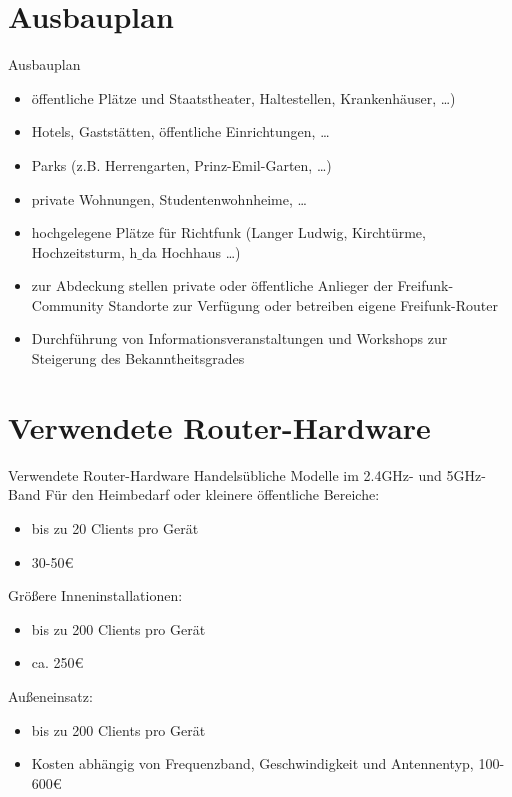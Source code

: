 \documentclass{beamer}
\begin{document}
\section{Ausbauplan}
\begin{frame}{Ausbauplan}
\vfill
\begin{itemize}
	\item öffentliche Plätze und Staatstheater, Haltestellen, Krankenhäuser, \ldots)
	\item Hotels, Gaststätten, öffentliche Einrichtungen, \ldots
	\item Parks (z.B. Herrengarten, Prinz-Emil-Garten, \ldots)
	\item private Wohnungen, Studentenwohnheime, \ldots
	\item hochgelegene Plätze für Richtfunk (Langer Ludwig, Kirchtürme, Hochzeitsturm, h$\_$da Hochhaus \ldots)
\end{itemize}
\vfill
\begin{itemize}
	\item zur Abdeckung stellen private oder öffentliche Anlieger der Freifunk-Community Standorte zur Verfügung oder betreiben eigene Freifunk-Router
	\item Durchführung von Informationsveranstaltungen und Workshops zur Steigerung des Bekanntheitsgrades
\end{itemize}
\vfill
\end{frame}

\section{Verwendete Router-Hardware}
\begin{frame}{Verwendete Router-Hardware}
Handelsübliche Modelle im 2.4GHz- und 5GHz-Band
\vfill
Für den Heimbedarf oder kleinere öffentliche Bereiche:
\begin{itemize}
\item bis zu 20 Clients pro Gerät
\item 30-50\euro{}
\end{itemize}
\vfill

Größere Inneninstallationen:
\begin{itemize}
\item bis zu 200 Clients pro Gerät
\item ca. 250\euro{}
\end{itemize}
\vfill

Außeneinsatz:
\begin{itemize}
\item bis zu 200 Clients pro Gerät
\item Kosten abhängig von Frequenzband, Geschwindigkeit und Antennentyp, 100-600\euro{}
\end{itemize}
\vfill
\end{frame}
\end{document}
